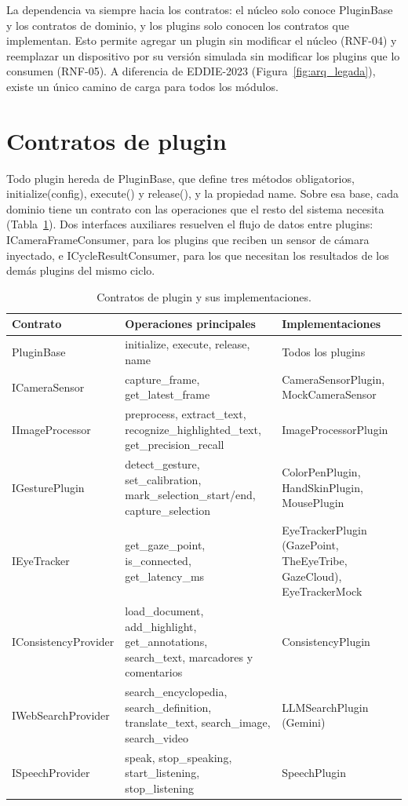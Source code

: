 La dependencia va siempre hacia los contratos: el núcleo solo conoce PluginBase y los contratos de dominio, y los plugins solo conocen los contratos que implementan. Esto permite agregar un plugin sin modificar el núcleo (RNF-04) y reemplazar un dispositivo por su versión simulada sin modificar los plugins que lo consumen (RNF-05). A diferencia de EDDIE-2023 (Figura~\ref{fig:arq_legada}), existe un único camino de carga para todos los módulos.

\section{Contratos de plugin}

Todo plugin hereda de PluginBase, que define tres métodos obligatorios, initialize(config), execute() y release(), y la propiedad name. Sobre esa base, cada dominio tiene un contrato con las operaciones que el resto del sistema necesita (Tabla~\ref{tab:contratos}). Dos interfaces auxiliares resuelven el flujo de datos entre plugins: ICameraFrameConsumer, para los plugins que reciben un sensor de cámara inyectado, e ICycleResultConsumer, para los que necesitan los resultados de los demás plugins del mismo ciclo.

\begin{table}[H]
\centering
\caption{Contratos de plugin y sus implementaciones.}
\label{tab:contratos}
\footnotesize
\begin{tabularx}{\textwidth}{>{\raggedright\arraybackslash}p{3.7cm} >{\raggedright\arraybackslash}X >{\raggedright\arraybackslash}p{4.0cm}}
\toprule
Contrato & Operaciones principales & Implementaciones \\ \midrule
PluginBase & initialize, execute, release, name & Todos los plugins \\ \midrule
ICameraSensor & capture\_frame, get\_latest\_frame & CameraSensorPlugin, MockCameraSensor \\ \midrule
IImageProcessor & preprocess, extract\_text, recognize\_highlighted\_text, get\_precision\_recall & ImageProcessorPlugin \\ \midrule
IGesturePlugin & detect\_gesture, set\_calibration, mark\_selection\_start/end, capture\_selection & ColorPenPlugin, HandSkinPlugin, MousePlugin \\ \midrule
IEyeTracker & get\_gaze\_point, is\_connected, get\_latency\_ms & EyeTrackerPlugin (GazePoint, TheEyeTribe, GazeCloud), EyeTrackerMock \\ \midrule
IConsistencyProvider & load\_document, add\_highlight, get\_annotations, search\_text, marcadores y comentarios & ConsistencyPlugin \\ \midrule
IWebSearchProvider & search\_encyclopedia, search\_definition, translate\_text, search\_image, search\_video & LLMSearchPlugin (Gemini) \\ \midrule
ISpeechProvider & speak, stop\_speaking, start\_listening, stop\_listening & SpeechPlugin \\ \bottomrule
\end{tabularx}
\end{table}

